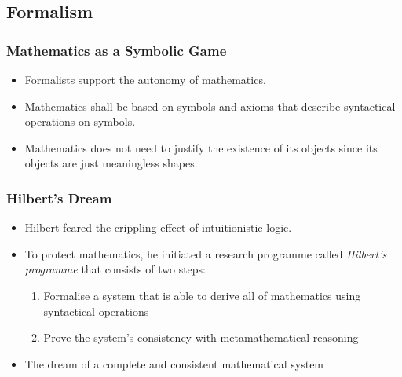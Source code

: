 \documentclass{beamer}
\begin{document}
\subsection{Formalism}
\begin{frame}
    \frametitle{Mathematics as a Symbolic Game}
    \begin{itemize}[<+->]
	\item Formalists support the autonomy of mathematics.
	\item Mathematics shall be based on symbols and axioms that describe syntactical operations on symbols.
	\item Mathematics does not need to justify the existence of its objects since its objects are just meaningless shapes.
    \end{itemize}
\end{frame}
\begin{frame}
    \frametitle{Hilbert's Dream}
    \begin{itemize}[<+->]
	\item Hilbert feared the crippling effect of intuitionistic logic.
	\item To protect mathematics, he initiated a research programme called \textit{Hilbert's programme} that consists of two steps:
	\begin{enumerate}
		\item Formalise a system that is able to derive all of mathematics using syntactical operations
		\item Prove the system's consistency with metamathematical reasoning
	\end{enumerate}
	\item The dream of a complete and consistent mathematical system
    \end{itemize}
\end{frame}
\end{document}

